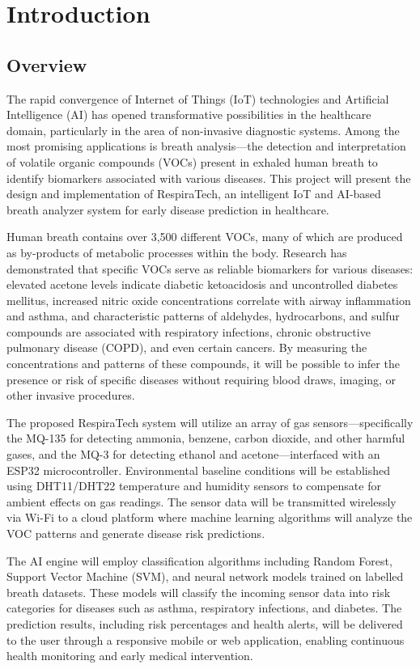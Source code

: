 \chapter{Introduction}

\section{Overview}
The rapid convergence of Internet of Things (IoT) technologies and Artificial Intelligence (AI) has opened transformative possibilities in the healthcare domain, particularly in the area of non-invasive diagnostic systems. Among the most promising applications is breath analysis---the detection and interpretation of volatile organic compounds (VOCs) present in exhaled human breath to identify biomarkers associated with various diseases. This project will present the design and implementation of RespiraTech, an intelligent IoT and AI-based breath analyzer system for early disease prediction in healthcare.

Human breath contains over 3,500 different VOCs, many of which are produced as by-products of metabolic processes within the body. Research has demonstrated that specific VOCs serve as reliable biomarkers for various diseases: elevated acetone levels indicate diabetic ketoacidosis and uncontrolled diabetes mellitus, increased nitric oxide concentrations correlate with airway inflammation and asthma, and characteristic patterns of aldehydes, hydrocarbons, and sulfur compounds are associated with respiratory infections, chronic obstructive pulmonary disease (COPD), and even certain cancers. By measuring the concentrations and patterns of these compounds, it will be possible to infer the presence or risk of specific diseases without requiring blood draws, imaging, or other invasive procedures.

The proposed RespiraTech system will utilize an array of gas sensors---specifically the MQ-135 for detecting ammonia, benzene, carbon dioxide, and other harmful gases, and the MQ-3 for detecting ethanol and acetone---interfaced with an ESP32 microcontroller. Environmental baseline conditions will be established using DHT11/DHT22 temperature and humidity sensors to compensate for ambient effects on gas readings. The sensor data will be transmitted wirelessly via Wi-Fi to a cloud platform where machine learning algorithms will analyze the VOC patterns and generate disease risk predictions.

The AI engine will employ classification algorithms including Random Forest, Support Vector Machine (SVM), and neural network models trained on labelled breath datasets. These models will classify the incoming sensor data into risk categories for diseases such as asthma, respiratory infections, and diabetes. The prediction results, including risk percentages and health alerts, will be delivered to the user through a responsive mobile or web application, enabling continuous health monitoring and early medical intervention.

